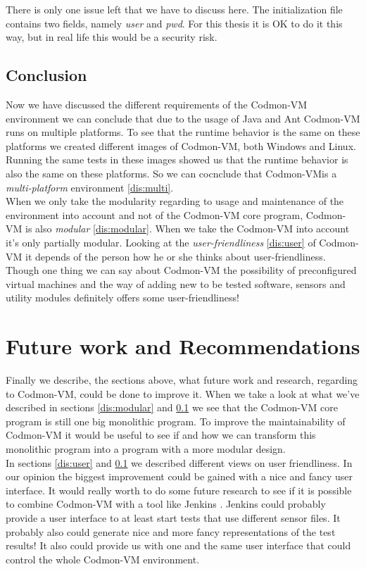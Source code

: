 \documentclass{article}
\newcommand{\project}{Codmon-VM}
\begin{document}
\noindent There is only one issue left that we have to discuss here. The initialization file contains two fields, namely \emph{user} and \emph{pwd}. For this thesis it is OK to do it this way, but in real life 
this would be a security risk. 

\subsection{Conclusion}
\label{dis:conclusion}
Now we have discussed the different requirements of the \project{} environment we can conclude that due to the usage of Java and Ant \project{} runs on multiple platforms. To see that the runtime behavior is 
the same on these platforms we created different images of \project{}, both Windows and Linux. Running the same tests in these images showed us that the runtime behavior is also the same on these platforms. So
we can cocnclude that \project is a \emph{multi-platform} environment \ref{dis:multi}.\\

\noindent When we only take the modularity regarding to usage and maintenance of the environment into account and not of the \project{} core program, \project{} is also \emph{modular} \ref{dis:modular}. 
When we take the \project{} into account it's only partially modular. Looking at the \emph{user-friendliness} \ref{dis:user} of \project{} it depends of the person how he or she thinks about 
user-friendliness. Though one thing we can say about \project{} the possibility of preconfigured virtual machines and the way of adding new to be tested software, sensors and utility modules definitely 
offers some user-friendliness!

\newpage
\section{Future work and Recommendations}
\label{sec:future}
Finally we describe, the sections above, what future work and research, regarding to \project{}, could be done to improve it. When we take a look at what we've described in sections \ref{dis:modular} and 
\ref{dis:conclusion} we see that the \project{} core program is still one big monolithic program. To improve the maintainability of \project{} it would be useful to see if and how we can transform this monolithic 
program into a program with a more modular design.\\

\noindent In sections \ref{dis:user} and \ref{dis:conclusion} we described different views on user friendliness. In our opinion the biggest improvement could be gained with a nice and fancy user interface. It would 
really worth to do some future research to see if it is possible to combine \project{} with a tool like Jenkins \cite{JenkinsDoc}. Jenkins could probably provide a user interface to at least start tests that use 
different sensor files. It probably also could generate nice and more fancy representations of the test results! It also could provide us with one and the same user interface that could control the whole \project{} 
environment.\\
\end{document}
